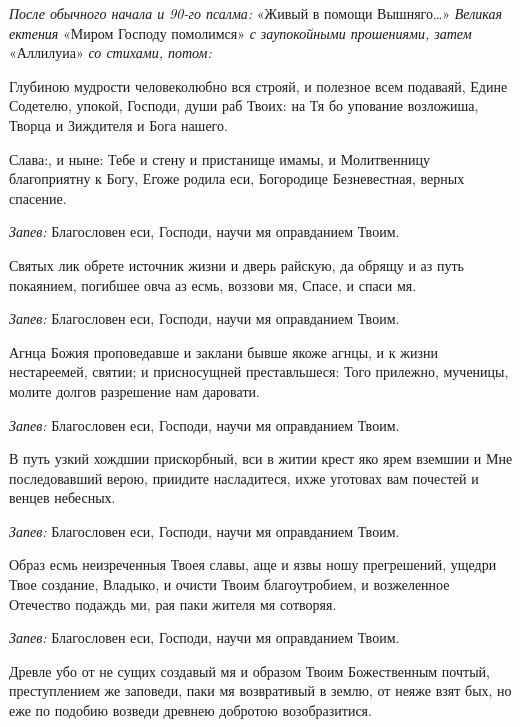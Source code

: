 \begin{mymulticols}
 


{\itshape После обычного начала и 90-го псалма:} «Живый в помощи Вышняго…» {\itshape Великая ектения} «Миром Господу помолимся» {\itshape с заупокойными прошениями, затем} «Аллилуиа» {\itshape со стихами, потом:}




Глубиною мудрости человеколюбно вся строяй, и полезное всем подаваяй, Едине Содетелю, упокой, Господи, души раб Твоих: на Тя бо упование возложиша, Творца и Зиждителя и Бога нашего. 

Слава:, и ныне: Тебе и стену и пристанище имамы, и Молитвенницу благоприятну к Богу, Егоже родила еси, Богородице Безневестная, верных спасение.




{\itshape Запев:} Благословен еси, Господи, научи мя оправданием Твоим. 

Святых лик обрете источник жизни и дверь райскую, да обрящу и аз путь покаянием, погибшее овча аз есмь, воззови мя, Спасе, и спаси мя. 

{\itshape Запев:} Благословен еси, Господи, научи мя оправданием Твоим. 

Агнца Божия проповедавше и заклани бывше якоже агнцы, и к жизни нестареемей, святии; и присносущней преставльшеся: Того прилежно, мученицы, молите долгов разрешение нам даровати. 

{\itshape Запев:} Благословен еси, Господи, научи мя оправданием Твоим. 

В путь узкий хождшии прискорбный, вси в житии крест яко ярем вземшии и Мне последовавший верою, приидите насладитеся, ихже уготовах вам почестей и венцев небесных. 

{\itshape Запев:} Благословен еси, Господи, научи мя оправданием Твоим. 

Образ есмь неизреченныя Твоея славы, аще и язвы ношу прегрешений, ущедри Твое создание, Владыко, и очисти Твоим благоутробием, и возжеленное Отечество подаждь ми, рая паки жителя мя сотворяя. 

{\itshape Запев:} Благословен еси, Господи, научи мя оправданием Твоим. 

Древле убо от не сущих создавый мя и образом Твоим Божественным почтый, преступлением же заповеди, паки мя возвративый в землю, от неяже взят бых, но еже по подобию возведи древнею добротою возобразитися. 


\end{mymulticols}
